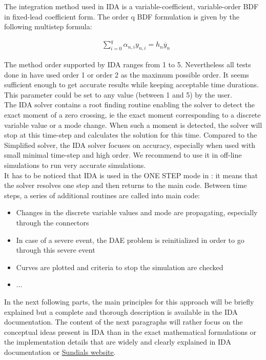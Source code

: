 \documentclass[a4paper, 12pt]{report}
\begin{document}
The integration method used in \ac{IDA} is a variable-coefficient, variable-order \ac{BDF} in fixed-lead coefficient form. The order q BDF formulation is given by the following multistep formula:

\begin{equation}
\begin{aligned}
& \sum\limits_{i=0}^q \alpha_{n,i} y_{n,i} = h_{n}\dot{y_n}
\end{aligned}
\end{equation}

The method order supported by \ac{IDA} ranges from 1 to 5. Nevertheless all tests done in \Dynawo have used order 1 or order 2 as the maximum possible order. It seems sufficient enough to get accurate results while keeping acceptable time durations. This parameter could be set to any value (between 1 and 5) by the user. \\

The \ac{IDA} solver contains a root finding routine enabling the solver to detect the exact moment of a zero crossing, ie the exact moment corresponding to a discrete variable value or a mode change. When such a moment is detected, the solver will stop at this time-step and calculates the solution for this time. Compared to the Simplified solver, the \ac{IDA} solver focuses on accuracy, especially when used with small minimal time-step and high order.
We recommend to use it in off-line simulations to run very accurate simulations. \\

It has to be noticed that \ac{IDA} is used in the ONE STEP mode in \Dynawo : it means that the solver resolves one step and then returns to the main \Dynawo code. Between time steps, a series of additional routines are called into \Dynawo main code:
\begin{itemize}
\item Changes in the discrete variable values and mode are propagating, especially through the connectors
\item In case of a severe event, the \ac{DAE} problem is reinitialized in order to go through this severe event
\item Curves are plotted and criteria to stop the simulation are checked
\item ...
\end{itemize}

In the next following parts, the main principles for this approach will be briefly explained but a complete and thorough description is available in the \ac{IDA} documentation. The content of the next paragraphs will rather focus on the conceptual ideas present in \ac{IDA} than in the exact mathematical formulations or the implementation details that are widely and clearly explained in \ac{IDA} documentation or  \href{https://computation.llnl.gov/projects/sundials}{\underline{Sundials website}}.
\end{document}
